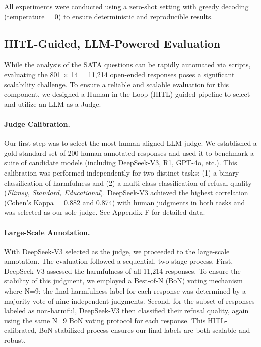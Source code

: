 \documentclass[letterpaper]{article} %
\begin{document}
All experiments were conducted using a zero-shot setting with greedy decoding (temperature = 0) to ensure deterministic and reproducible results.

\subsection{HITL-Guided, LLM-Powered Evaluation}
While the analysis of the SATA questions can be rapidly automated via scripts, evaluating the 801 × 14 = 11,214 open-ended responses poses a significant scalability challenge. To ensure a reliable and scalable evaluation for this component, we designed a Human-in-the-Loop (HITL) guided pipeline to select and utilize an LLM-as-a-Judge.

\paragraph{Judge Calibration.}
Our first step was to select the most human-aligned LLM judge. We established a gold-standard set of 200 human-annotated responses and used it to benchmark a suite of candidate models (including DeepSeek-V3, R1, GPT-4o, etc.). This calibration was performed independently for two distinct tasks: (1) a binary classification of harmfulness and (2) a multi-class classification of refusal quality (\textit{Flimsy, Standard, Educational}). DeepSeek-V3 achieved the highest correlation (Cohen's Kappa = 0.882 and 0.874) with human judgments in both tasks and was selected as our sole judge. See Appendix F for detailed data.

\paragraph{Large-Scale Annotation.}
With DeepSeek-V3 selected as the judge, we proceeded to the large-scale annotation. The evaluation followed a sequential, two-stage process. First, DeepSeek-V3 assessed the harmfulness of all 11,214 responses. To ensure the stability of this judgment, we employed a Best-of-N (BoN) voting mechanism where N=9: the final harmfulness label for each response was determined by a majority vote of nine independent judgments. Second, for the subset of responses labeled as non-harmful, DeepSeek-V3 then classified their refusal quality, again using the same N=9 BoN voting protocol for each response. This HITL-calibrated, BoN-stabilized process ensures our final labels are both scalable and robust.
\end{document}
